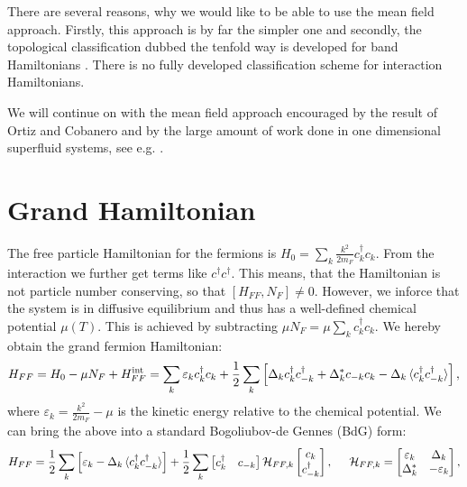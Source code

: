 There are several reasons, why we would like to be able to use the mean field approach. Firstly, this approach is by far the simpler one and secondly, the topological classification dubbed the tenfold way is developed for band Hamiltonians \cite{Ryu.Topology}. There is no fully developed classification scheme for interaction Hamiltonians. 

We will continue on with the mean field approach encouraged by the result of Ortiz and Cobanero and by the large amount of work done in one dimensional superfluid systems, see e.g. \cite{Alicea, KitaevTopPhases, KitaevQuantumWires, LiYangChen, FuKane2006, GreiterIsingKitaevChain, DeGottardiMajoranaFermions, BudichTopInvMajoranaWires, ZhangWu}. 

\section{Grand Hamiltonian} \label{sec.HFFfull}
The free particle Hamiltonian for the fermions is $H_0 = \sum_k \frac{k^2}{2m_F} c^\dagger_k c_k$. From the interaction we further get terms like $c^\dagger c^\dagger$. This means, that the Hamiltonian is not particle number conserving, so that $[H_{FF}, N_F] \neq 0$. However, we inforce that the system is in diffusive equilibrium and thus has a well-defined chemical potential $\mu(T)$. This is achieved by subtracting $\mu N_F = \mu \sum_k c^\dagger_k c_k$. We hereby obtain the grand fermion Hamiltonian:
\begin{equation}
H_{FF} = H_0-\mu N_F + H^\text{int}_{FF} = \sum_k \varepsilon_k c^\dagger_k c_k + \frac{1}{2}\sum_{k} \left[ \Delta_k c^\dagger_k c^\dagger_{-k} + \Delta^*_k c_{-k} c_k  - \Delta_k \braket {c^\dagger_{k}c^\dagger_{-k}} \right], 
\label{eq.HFFdef}
\end{equation} 
where $\varepsilon_k = \frac{k^2}{2m_F}-\mu$ is the kinetic energy relative to the chemical potential. We can bring the above into a standard Bogoliubov-de Gennes (BdG) form:
\begin{equation}
H_{FF} = \frac{1}{2}\sum_k \left[\varepsilon_k - \Delta_k \braket {c^\dagger_k c^\dagger_{-k}}\right] + \frac{1}{2}\sum_{k} \begin{bmatrix} c_k^\dagger & c_{-k} \end{bmatrix} \mathcal{H}_{FF,k} \begin{bmatrix} c_k \\ c^\dagger_{-k} \end{bmatrix}, \hspace{0.5cm} \mathcal{H}_{FF,k} = \begin{bmatrix} \varepsilon_k & \Delta_k \\ \Delta^*_k & -\varepsilon_k \end{bmatrix}, 
\end{equation}
